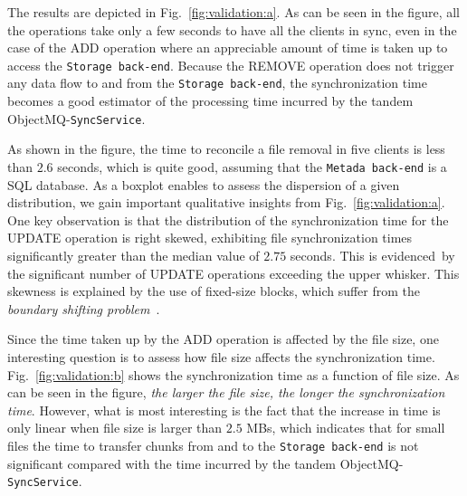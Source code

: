 The results are depicted in Fig.~\ref{fig:validation:a}. As can be seen in the figure, all the operations take
only a few seconds to have all the clients in sync, even in the case of the ADD operation where an appreciable
amount of time is taken up to access the \texttt{Storage back-end}. Because the REMOVE operation does not trigger any data flow to and from the
\texttt{Storage back-end}, the synchronization time becomes a good estimator of the processing time
incurred by the tandem ObjectMQ-\texttt{SyncService}. 

As shown in the figure, the time to reconcile
a file removal in five clients is less than $2.6$ seconds, which is quite good, assuming that the
\texttt{Metada back-end} is a SQL database.
As a boxplot enables to assess the dispersion of a given distribution, 
we gain important qualitative
insights from Fig.~\ref{fig:validation:a}. One key observation is that the distribution of the
synchronization time for the UPDATE operation is right skewed, exhibiting file synchronization times
significantly greater than the median value of $2.75$ seconds. This is evidenced~by
the significant number of UPDATE operations exceeding the upper whisker. This skewness is explained
by the use of fixed-size blocks, which suffer from the \textit{boundary shifting problem}~\cite{Eshghi05}.

Since the time taken up by the ADD operation is affected by the file size, one interesting question
is to assess how file size affects the synchronization time. Fig.~\ref{fig:validation:b} shows the synchronization
time as a function of file size. As can be seen in the figure, \textit{the larger the file size, the longer
the synchronization time}. However, what is most interesting is the fact that the increase in time
is only linear when file size is larger than $2.5$ MBs, which indicates that for small files the
time to transfer chunks from and to the \texttt{Storage back-end} is not significant compared
with the time incurred by the tandem ObjectMQ-\texttt{SyncService}. 